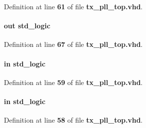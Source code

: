 Definition at line {\bf 61} of file {\bf tx\+\_\+pll\+\_\+top.\+vhd}.

\paragraph[{dynps\+\_\+done}]{ {\bfseries \textcolor{keywordflow}{out}\textcolor{vhdlchar}{ }} {\bfseries \textcolor{comment}{std\+\_\+logic}\textcolor{vhdlchar}{ }} \hspace{0.3cm}{\ttfamily [Port]}}\label{classtx__pll__top_ab61437caf7f2a64ce9edbc616f30bdfe}


Definition at line {\bf 67} of file {\bf tx\+\_\+pll\+\_\+top.\+vhd}.

\paragraph[{dynps\+\_\+en}]{ {\bfseries \textcolor{keywordflow}{in}\textcolor{vhdlchar}{ }} {\bfseries \textcolor{comment}{std\+\_\+logic}\textcolor{vhdlchar}{ }} \hspace{0.3cm}{\ttfamily [Port]}}\label{classtx__pll__top_ac6ea2fb22c423b5264d4d118863c7cce}


Definition at line {\bf 59} of file {\bf tx\+\_\+pll\+\_\+top.\+vhd}.

\paragraph[{dynps\+\_\+mode}]{ {\bfseries \textcolor{keywordflow}{in}\textcolor{vhdlchar}{ }} {\bfseries \textcolor{comment}{std\+\_\+logic}\textcolor{vhdlchar}{ }} \hspace{0.3cm}{\ttfamily [Port]}}\label{classtx__pll__top_a0e7ead97c72340546855513af1e9327c}


Definition at line {\bf 58} of file {\bf tx\+\_\+pll\+\_\+top.\+vhd}.

